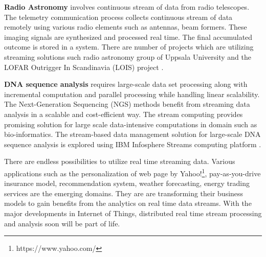 \documentclass{acm_proc_article-sp}
\begin{document}
\textbf{Radio Astronomy} involves continuous stream of data from radio telescopes. The telemetry communication process collects continuous stream of data remotely using various radio elements such as antennas, beam formers. These imaging signals are synthesized and processed real time. The final accumulated outcome is stored in a system. There are number of projects which are utilizing streaming solutions such radio astronomy group of Uppsala University and the LOFAR Outrigger In Scandinavia (LOIS) project \cite{5495521} \cite{IBM:Infosphere:Stream:WhitePaper}.  

\textbf{DNA sequence analysis} requires large-scale data set processing along with incremental computation and parallel processing while handling linear scalability. The Next-Generation Sequencing (NGS) methods benefit  from streaming data analysis in a scalable and cost-efficient way. The stream computing provides promising solution for large scale data-intensive computations in domain such as bio-informatics. The stream-based data management solution for large-scale DNA sequence analysis is explored using IBM Infosphere Streams computing platform \cite{Kienzler:2011:LDS:2238436.2238494}.


There are endless possibilities to utilize real time streaming data. Various applications such as the  personalization of web page by Yahoo!\footnote{https://www.yahoo.com/}, pay-as-you-drive insurance model, recommendation system, weather forecasting, energy trading services are the emerging domains. They are are transforming their business models to gain benefits from the analytics on real time data streams. With the major developments in Internet of Things, distributed real time stream processing  and analysis soon will be part of life.  
\end{document}
